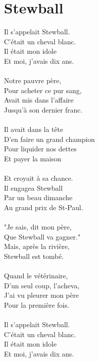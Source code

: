 \section*{Stewball}
Il s'appelait Stewball.\\
C'était un cheval blanc.\\
Il était mon idole\\
Et moi, j'avais dix ans.\\
\\
Notre pauvre père,\\
Pour acheter ce pur sang,\\
Avait mis dans l'affaire\\
Jusqu'à son dernier franc.\\
\\
Il avait dans la tête\\
D'en faire un grand champion\\
Pour liquider nos dettes\\
Et payer la maison\\
\\
Et croyait à sa chance.\\
Il engagea Stewball\\
Par un beau dimanche\\
Au grand prix de St-Paul.\\
\\
"Je sais, dit mon père,\\
Que Stewball va gagner."\\
Mais, après la rivière,\\
Stewball est tombé.\\
\\
Quand le vétérinaire,\\
D'un seul coup, l'acheva,\\
J'ai vu pleurer mon père\\
Pour la première fois.\\
\\
Il s'appelait Stewball.\\
C'était un cheval blanc.\\
Il était mon idole\\
Et moi, j'avais dix ans.